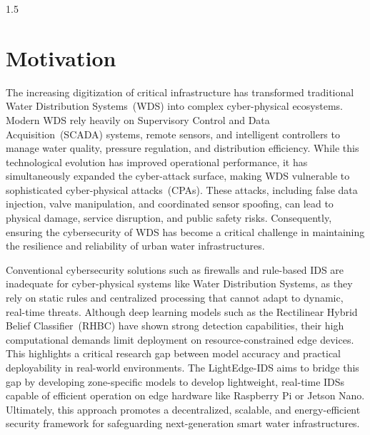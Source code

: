 \newpage
\thispagestyle{empty}
%
\begin{spacing}{1.5}
%
\chapter{Motivation}
The increasing digitization of critical infrastructure has transformed traditional Water Distribution Systems~(WDS) into complex cyber-physical ecosystems. Modern WDS rely heavily on Supervisory Control and Data Acquisition~(SCADA) systems, remote sensors, and intelligent controllers to manage water quality, pressure regulation, and distribution efficiency. While this technological evolution has improved operational performance, it has simultaneously expanded the cyber-attack surface, making WDS vulnerable to sophisticated cyber-physical attacks~(CPAs). These attacks, including false data injection, valve manipulation, and coordinated sensor spoofing, can lead to physical damage, service disruption, and public safety risks. Consequently, ensuring the cybersecurity of WDS has become a critical challenge in maintaining the resilience and reliability of urban water infrastructures.

Conventional cybersecurity solutions such as firewalls and rule-based IDS are inadequate for cyber-physical systems like Water Distribution Systems, as they rely on static rules and centralized processing that cannot adapt to dynamic, real-time threats. Although deep learning models such as the Rectilinear Hybrid Belief Classifier~(RHBC) have shown strong detection capabilities, their high computational demands limit deployment on resource-constrained edge devices. This highlights a critical research gap between model accuracy and practical deployability in real-world environments. The LightEdge-IDS aims to bridge this gap by developing zone-specific models to develop lightweight, real-time IDSs capable of efficient operation on edge hardware like Raspberry Pi or Jetson Nano. Ultimately, this approach promotes a decentralized, scalable, and energy-efficient security framework for safeguarding next-generation smart water infrastructures.

\end{spacing}

